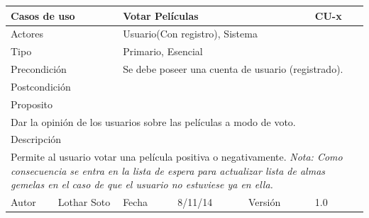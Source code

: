 \documentclass{article}
\begin{document}
\begin{table}[h]
\begin{tabular}{|l|l|l|l|l|l|}
\hline
\multicolumn{2}{|p{2cm}|}{Casos de uso}  & \multicolumn{3}{p{7cm}|}{\textbf{Votar Películas}} & CU-x \\
\hline
\multicolumn{2}{|p{2cm}|}{Actores}       & \multicolumn{4}{p{8cm}|}{Usuario(Con registro), Sistema}        \\
\hline
\multicolumn{2}{|p{2cm}|}{Tipo}          & \multicolumn{4}{p{8cm}|}{Primario, Esencial}        \\
\hline
\multicolumn{2}{|p{2cm}|}{Precondición}  & \multicolumn{4}{p{8cm}|}{Se debe poseer una cuenta de usuario (registrado).}        \\
\hline
\multicolumn{2}{|p{2cm}|}{Postcondición} & \multicolumn{4}{p{8cm}|}{}        \\
\hline
\multicolumn{6}{|p{10cm}|}{Proposito}                                   \\
\hline
\multicolumn{6}{|p{10cm}|}{Dar la opinión de los usuarios sobre las películas a modo de voto.}                                            \\
\hline
\multicolumn{6}{|p{10cm}|}{Descripción}                                 \\
\hline
\multicolumn{6}{|p{10cm}|}{Permite al usuario votar una película positiva o negativamente.
\linebreak \textit{Nota: Como consecuencia se entra en la lista de espera para actualizar lista de almas gemelas en el caso de que el usuario no estuviese ya en ella.}}                                            \\
\hline
Autor          &       Lothar Soto        & Fecha    &  8/11/14   &   Versión  & 1.0\\     
\hline
\end{tabular}
\end{table}
\end{document}
